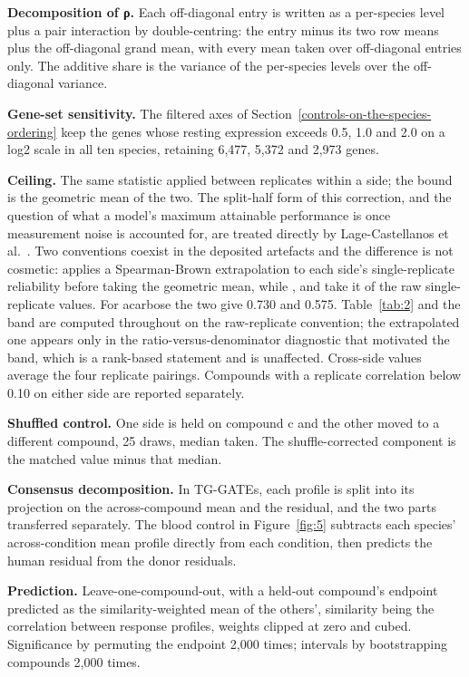 \documentclass[11pt,a4paper]{article}
\begin{document}
\textbf{Decomposition of ρ.} Each off-diagonal entry is written as a
per-species level plus a pair interaction by double-centring: the entry
minus its two row means plus the off-diagonal grand mean, with every
mean taken over off-diagonal entries only. The additive share is the
variance of the per-species levels over the off-diagonal variance.

\textbf{Gene-set sensitivity.} The filtered axes of Section~\ref{controls-on-the-species-ordering} keep the
genes whose resting expression exceeds 0.5, 1.0 and 2.0 on a log2 scale
in all ten species, retaining 6,477, 5,372 and 2,973 genes.

\textbf{Ceiling.} The same statistic applied between replicates within a
side; the bound is the geometric mean of the two. The split-half form of
this correction, and the question of what a model's maximum attainable
performance is once measurement noise is accounted for, are treated
directly by Lage-Castellanos et al.~\cite{ref40}. Two conventions coexist in
the deposited artefacts and the difference is not cosmetic:
\protect{} applies a Spearman-Brown extrapolation
to each side's single-replicate reliability before taking the geometric
mean, while \protect{},
\protect{} and \protect{}
take it of the raw single-replicate values. For acarbose the two give
0.730 and 0.575. Table~\ref{tab:2} and the band are computed throughout on the
raw-replicate convention; the extrapolated one appears only in the
ratio-versus-denominator diagnostic that motivated the band, which is a
rank-based statement and is unaffected. Cross-side values average the
four replicate pairings. Compounds with a replicate correlation below
0.10 on either side are reported separately.

\textbf{Shuffled control.} One side is held on compound c and the other
moved to a different compound, 25 draws, median taken. The
shuffle-corrected component is the matched value minus that median.

\textbf{Consensus decomposition.} In TG-GATEs, each profile is split
into its projection on the across-compound mean and the residual, and
the two parts transferred separately. The blood control in Figure~\ref{fig:5}
subtracts each species' across-condition mean profile directly from each
condition, then predicts the human residual from the donor residuals.

\textbf{Prediction.} Leave-one-compound-out, with a held-out compound's
endpoint predicted as the similarity-weighted mean of the others',
similarity being the correlation between response profiles, weights
clipped at zero and cubed. Significance by permuting the endpoint 2,000
times; intervals by bootstrapping compounds 2,000 times.
\end{document}
